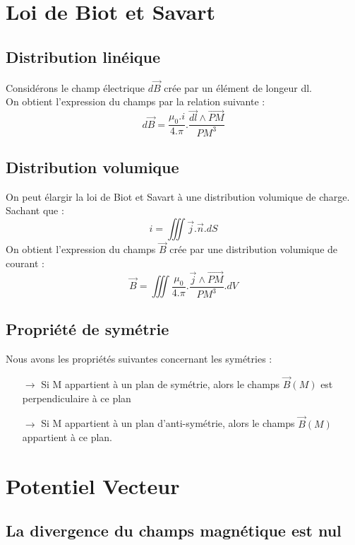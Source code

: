 \chapter{Loi de Biot et Savart}
\section{Distribution linéique}
\begin{enon}
Considérons le champ électrique $d\overrightarrow{B}$ crée par un élément de longeur dl.\\
On obtient l'expression du champs par la relation suivante :
$$d\overrightarrow{B} = \dfrac{\mu_0.i}{4.\pi}.\dfrac{\overrightarrow{dl}\wedge\overrightarrow{PM}}{PM^3}$$
\end{enon}
\section{Distribution volumique}
\begin{enon}
On peut élargir la loi de Biot et Savart à une distribution volumique de charge.\\
Sachant que : 
$$i = \iiint \overrightarrow{j}.\overrightarrow{n}.dS$$
On obtient l'expression du champs $\overrightarrow{B}$ crée par une distribution volumique de courant :
$$\overrightarrow{B} = \iiint \dfrac{\mu_0}{4.\pi}.\dfrac{\overrightarrow{j}\wedge\overrightarrow{PM}}{PM^3}.dV$$
\end{enon}
\section{Propriété de symétrie}
\begin{prop}
Nous avons les propriétés suivantes concernant les symétries :\\
\begin{itemize}
 \item[$\rightarrow$] Si M appartient à un plan de symétrie, alors le champs $\overrightarrow{B}(M)$ est perpendiculaire à ce plan
 \item[$\rightarrow$] Si M appartient à un plan d'anti-symétrie, alors le champs $\overrightarrow{B}(M)$ appartient à ce plan.
\end{itemize}
\end{prop}
\chapter{Potentiel Vecteur}
\section{La divergence du champs magnétique est nul}

